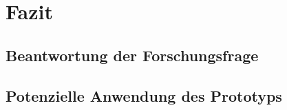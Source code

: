 \chapter{Fazit}

\section{Beantwortung der Forschungsfrage}

\section{Potenzielle Anwendung des Prototyps}